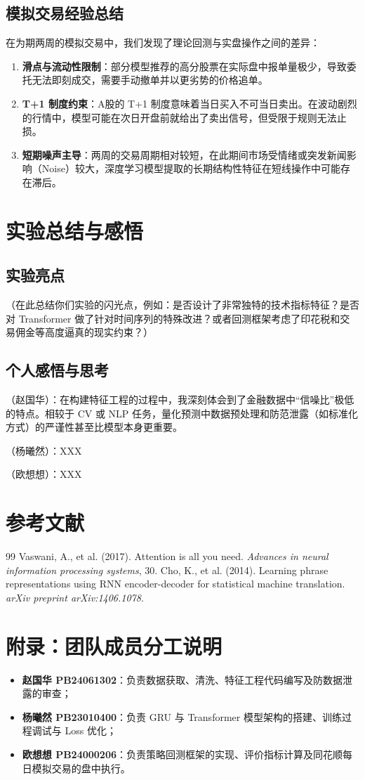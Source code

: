 \documentclass[9pt,a4paper,twoside]{rho-class/rho}
\begin{document}
    \subsection{模拟交易经验总结}
    在为期两周的模拟交易中，我们发现了理论回测与实盘操作之间的差异：
    \begin{enumerate}
        \item \textbf{滑点与流动性限制}：部分模型推荐的高分股票在实际盘中报单量极少，导致委托无法即刻成交，需要手动撤单并以更劣势的价格追单。
        \item \textbf{T+1 制度约束}：A股的 T+1 制度意味着当日买入不可当日卖出。在波动剧烈的行情中，模型可能在次日开盘前就给出了卖出信号，但受限于规则无法止损。
        \item \textbf{短期噪声主导}：两周的交易周期相对较短，在此期间市场受情绪或突发新闻影响（Noise）较大，深度学习模型提取的长期结构性特征在短线操作中可能存在滞后。
    \end{enumerate}

\section{实验总结与感悟}

    \subsection{实验亮点}
    （在此总结你们实验的闪光点，例如：是否设计了非常独特的技术指标特征？是否对 Transformer 做了针对时间序列的特殊改进？或者回测框架考虑了印花税和交易佣金等高度逼真的现实约束？）

    \subsection{个人感悟与思考}
    （赵国华）：在构建特征工程的过程中，我深刻体会到了金融数据中“信噪比”极低的特点。相较于 CV 或 NLP 任务，量化预测中数据预处理和防范泄露（如标准化方式）的严谨性甚至比模型本身更重要。
    
    （杨曦然）：XXX 
    
    （欧想想）：XXX 

\section*{参考文献}
    \begin{thebibliography}{99}
         Vaswani, A., et al. (2017). Attention is all you need. \textit{Advances in neural information processing systems}, 30.
         Cho, K., et al. (2014). Learning phrase representations using RNN encoder-decoder for statistical machine translation. \textit{arXiv preprint arXiv:1406.1078}.
    \end{thebibliography}

\section*{附录：团队成员分工说明}
\begin{itemize}
    \item \textbf{赵国华 PB24061302}：负责数据获取、清洗、特征工程代码编写及防数据泄露的审查；
    \item \textbf{杨曦然 PB23010400}：负责 GRU 与 Transformer 模型架构的搭建、训练过程调试与 Loss 优化；
    \item \textbf{欧想想 PB24000206}：负责策略回测框架的实现、评价指标计算及同花顺每日模拟交易的盘中执行。
\end{itemize}
\end{document}
